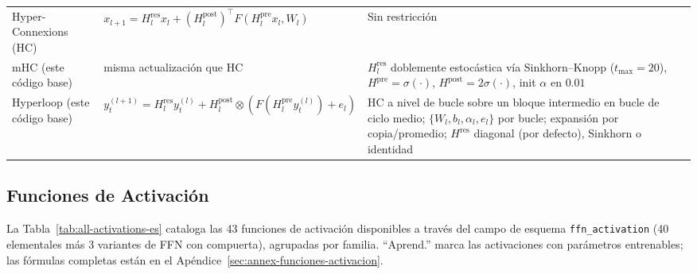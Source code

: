 \begin{longtable}{L{2.2cm}L{5.8cm}L{3.8cm}L{3.0cm}}
Hyper-Connexions (HC) & $x_{l+1} = H^{\text{res}}_l x_l + (H^{\text{post}}_l)^{\top} F(H^{\text{pre}}_l x_l, W_l)$ & Sin restricción & \citep{xie_mhc_2025} \\
mHC (este código base) & misma actualización que HC & $H^{\text{res}}_l$ doblemente estocástica vía Sinkhorn--Knopp ($t_{\max} = 20$), $H^{\text{pre}} = \sigma(\cdot)$, $H^{\text{post}} = 2\sigma(\cdot)$, init $\alpha$ en $0.01$ & \citep{xie_mhc_2025} \\
Hyperloop (este código base) & $y^{(l+1)}_t = H^{\text{res}}_l y^{(l)}_t + H^{\text{post}}_l \otimes (F(H^{\text{pre}}_l y^{(l)}_t) + e_l)$ & HC a nivel de bucle sobre un bloque intermedio en bucle de ciclo medio; $\{W_l, b_l, \alpha_l, e_l\}$ por bucle; expansión por copia/promedio; $H^{\text{res}}$ diagonal (por defecto), Sinkhorn o identidad & \citep{zeitoun_hyperloop_2026} \\
\bottomrule
\end{longtable}
\normalsize

\subsection{Funciones de Activación}

La Tabla~\ref{tab:all-activations-es} cataloga las 43 funciones de activación disponibles a través del campo de esquema \texttt{ffn\_activation} (40 elementales más 3 variantes de FFN con compuerta), agrupadas por familia. ``Aprend.'' marca las activaciones con parámetros entrenables; las fórmulas completas están en el Apéndice~\ref{sec:annex-funciones-activacion}.


